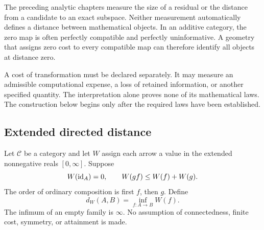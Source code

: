 \clearpage
{}\label{sec:transport-cost}
The preceding analytic chapters measure the size of a residual or the distance from a candidate to an exact subspace. Neither measurement automatically defines a distance between mathematical objects. In an additive category, the zero map is often perfectly compatible and perfectly uninformative. A geometry that assigns zero cost to every compatible map can therefore identify all objects at distance zero.

A cost of transformation must be declared separately. It may measure an admissible computational expense, a loss of retained information, or another specified quantity. The interpretation alone proves none of its mathematical laws. The construction below begins only after the required laws have been established.

\subsection{Extended directed distance}
Let \(\mathcal C\) be a category and let \(W\) assign each arrow a value in the extended nonnegative reals \([0,\infty]\). Suppose
\[
 W(\operatorname{id}_A)=0,\qquad W(gf)\le W(f)+W(g).
\]
The order of ordinary composition is first \(f\), then \(g\). Define
\[
 d_W(A,B)=\inf_{f:A\to B}W(f).
\]
The infimum of an empty family is \(\infty\). No assumption of connectedness, finite cost, symmetry, or attainment is made.

